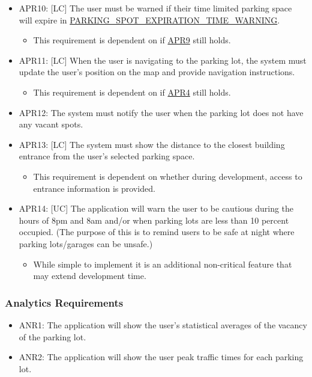 \documentclass[]{article}
\begin{document}
\begin{itemize}
		\item APR10: [LC] The user must be warned if their time limited parking space will expire in \hyperlink{EXPTIME}{PARKING\_SPOT\_EXPIRATION\_TIME\_WARNING}.
		\begin{itemize}
			\item This requirement is dependent on if \hyperlink{APRb}{APR9} still holds.
		\end{itemize}
		
		\item APR11: [LC] When the user is navigating to the parking lot, the system must update the user’s position on the map and provide navigation instructions.
		\begin{itemize}
			\item This requirement is dependent on if \hyperlink{APRa}{APR4} still holds.
		\end{itemize}
		
		\item APR12: The system must notify the user when the parking lot does not have any vacant spots.
		
		\item APR13: [LC] The system must show the distance to the closest building entrance from the user’s selected parking space.
		\begin{itemize}
			\item This requirement is dependent on whether during development, access to entrance information is provided.
		\end{itemize}
		
		
		\item APR14: [UC] The application will warn the user to be cautious during the hours of 8pm and 8am and/or when parking lots are less than 10 percent occupied. (The purpose of this is to remind users to be safe at night where parking lots/garages can be unsafe.)
		\begin{itemize}
			\item While simple to implement it is an additional non-critical feature that may extend development time.
		\end{itemize}
	\end{itemize}
\subsubsection{Analytics Requirements}
\begin{itemize}
	\item ANR1: The application will show the user’s statistical averages of the vacancy of the parking lot. 
	\item ANR2: The application will show the user peak traffic times for each parking lot.
\end{itemize}
\end{document}

